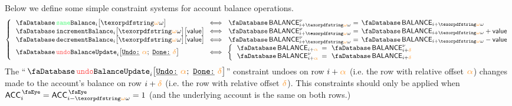 Below we define some simple constraint systems for account balance operations.
\[
\left\{ \begin{array}{lcl}
	\accSameBalance         {i}{\relof}              & \!\!\! \iff \!\!\! & \accBalance\new_{i + \relof} = \accBalance_{i + \relof}               \\
	\accIncrementBalance    {i}{\relof}{\col{value}} & \!\!\! \iff \!\!\! & \accBalance\new_{i + \relof} = \accBalance_{i + \relof} + \col{value} \\
	\accDecrementBalance    {i}{\relof}{\col{value}} & \!\!\! \iff \!\!\! & \accBalance\new_{i + \relof} = \accBalance_{i + \relof} - \col{value} \\
	\accUndoBalanceUpdate   {i}{\reluo}{\reldo}      & \!\!\! \iff \!\!\! &
	\left\{ \begin{array}{lcl}
		\accBalance     _{i + \reluo} & \!\!\! = \!\!\! & \accBalance\new _{i + \reldo} \\
		\accBalance\new _{i + \reluo} & \!\!\! = \!\!\! & \accBalance	  _{i + \reldo} \\
	\end{array} \right. \\
\end{array} \right.
\]
\saNote{}
The ``$\accUndoBalanceUpdate {i}{\reluo}{\reldo}$'' constraint undoes on row $i + \reluo$ (i.e. the row with relative offset $\reluo$) changes made to the account's balance on row $i + \reldo$ (i.e. the row with relative offset $\reldo$).
This constraints should only be applied when $\peekAccount_{i} = \peekAccount_{i - \relof} = 1$ (and the underlying account is the same on both rows.)
